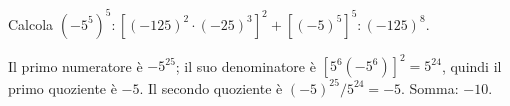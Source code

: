 
\begin{esercizio}
Calcola $(-5^5)^5:\left[(-125)^2\cdot(-25)^3\right]^2+\left[(-5)^5\right]^5:(-125)^8$.
\end{esercizio}

\begin{soluzione}
Il primo numeratore è $-5^{25}$; il suo denominatore è $[5^6(-5^6)]^2=5^{24}$, quindi il primo quoziente è $-5$. Il secondo quoziente è $(-5)^{25}/5^{24}=-5$. Somma: $-10$.
\end{soluzione}
